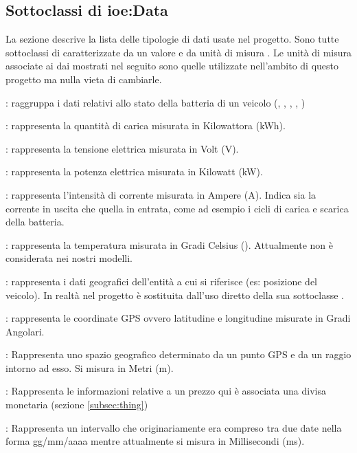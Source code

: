 \subsection{Sottoclassi di ioe:Data}\label{subsec:ioe-data}

La sezione descrive la lista delle tipologie di dati usate nel progetto. Sono tutte sottoclassi di  caratterizzate da un valore e da unità di misura . Le unità di misura associate ai dai mostrati nel seguito sono quelle utilizzate nell'ambito di questo progetto ma nulla vieta di cambiarle.

\begin{description}
	\item {}: raggruppa i dati relativi allo stato della batteria di un veicolo (, , , , )
	\item {}: rappresenta la quantità di carica misurata in Kilowattora (kWh).
	\item {}: rappresenta la tensione elettrica misurata in Volt (V).
	\item {}: rappresenta la potenza elettrica misurata in Kilowatt (kW). 
	\item {}: rappresenta l'intensità di corrente misurata in Ampere (A). Indica sia la corrente in uscita che quella in entrata, come ad esempio i cicli di carica e scarica della batteria.
	\item {}: rappresenta la temperatura misurata in Gradi Celsius (\textcelsius). Attualmente non è considerata nei nostri modelli.
	\item {}: rappresenta i dati geografici dell'entità a cui si riferisce (es: posizione del veicolo). In realtà nel progetto è sostituita dall'uso diretto della sua sottoclasse .
	\item {}: rappresenta le coordinate GPS ovvero latitudine e longitudine misurate in Gradi Angolari.
	\item {}: Rappresenta uno spazio geografico determinato da un punto GPS e da un raggio intorno ad esso. Si misura in Metri (m).
	\item {}: Rappresenta le informazioni relative a un prezzo qui è associata una divisa monetaria (sezione \ref{subsec:thing})
	\item {}: Rappresenta un intervallo che originariamente era compreso tra due date nella forma gg/mm/aaaa mentre attualmente si misura in Millisecondi (ms).
\end{description}

